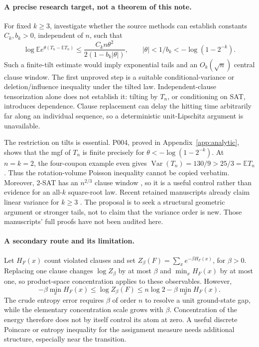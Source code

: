 \documentclass[11pt,a4paper]{article}
\begin{document}
\paragraph{A precise research target, not a theorem of this note.}
For fixed $k\ge3$, investigate whether the source methods can establish
constants $C_k,b_k>0$, independent of $n$, such that
\begin{equation}
 \log\mathbb E e^{\theta(T_n-\mathbb E T_n)}
 \le \frac{C_k n\theta^2}{2(1-b_k|\theta|)},\qquad
 |\theta|<1/b_k< -\log(1-2^{-k}).
 \label{eq:target-cgf}
\end{equation}
Such a finite-tilt estimate would imply exponential tails and an
$O_k(\sqrt n)$ central clause window. The first unproved step is a suitable
conditional-variance or deletion/influence inequality under the tilted law.
Independent-clause tensorization alone does not establish it: tilting by
$T_n$, or conditioning on SAT, introduces dependence. Clause replacement
can delay the hitting time arbitrarily far along an individual sequence,
so a deterministic unit-Lipschitz argument is unavailable.

The restriction on tilts is essential. P004, proved in
Appendix~\ref{app:analytic}, shows that the mgf of $T_n$ is finite precisely
for $\theta< -\log(1-2^{-k})$. At $n=k=2$, the four-coupon example even gives
$\operatorname{Var}(T_n)=130/9>25/3=\mathbb E T_n$.
Thus the rotation-volume Poisson inequality cannot be copied verbatim.
Moreover, 2-SAT has an $n^{2/3}$ clause window \citep[Theorem 1.1]{bbckw2001},
so it is a useful control rather than evidence for an all-$k$ square-root law.
Recent retained manuscripts already claim linear variance for $k\ge3$
\citep{oaVariance,oaVariance3}. The proposal is to seek a structural geometric
argument or stronger tails, not to claim that the variance order is new.
Those manuscripts' full proofs have not been audited here.

\paragraph{A secondary route and its limitation.}
Let $H_F(x)$ count violated clauses and set
$Z_\beta(F)=\sum_x e^{-\beta H_F(x)}$, for $\beta>0$. Replacing one clause
changes $\log Z_\beta$ by at most $\beta$ and $\min_xH_F(x)$ by at most one,
so product-space concentration applies to these observables. However,
\[
 -\beta\min_xH_F(x)\le\log Z_\beta(F)
 \le n\log2-\beta\min_xH_F(x).
\]
The crude entropy error requires $\beta$ of order $n$ to resolve a unit
ground-state gap, while the elementary concentration scale grows with
$\beta$. Concentration of the energy therefore does not by itself control
its atom at zero. A useful discrete Poincare or entropy inequality for the
assignment measure needs additional structure, especially near the transition.
\end{document}
